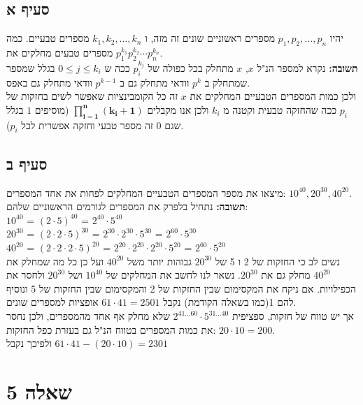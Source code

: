 \documentclass{article}
\begin{document}
	\subsection*{סעיף א}
	יהיו $p_1,p_2,\dots,p_n$ מספרים ראשוניים שונים זה מזה, ו $k_1, k_2,\dots,k_n$ מספרים טבעיים.
	כמה מספרים טבעים מחלקים את $p_1^{k_1}p_2^{k_2}\cdots p_n^{k_n}$. \\
	\textbf{תשובה:}
	נקרא למספר הנ"ל $x$, $x$ מתחלק בכל כפולה של $p_i^{k_j}$ ככה ש $0 \leq j \leq k_i$ בגלל שמספר שמתחלק ב $p^k$ וודאי מתחלק גם ב $p^{k-1}$ וודאי מתחלק גם באפס. \\
	ולכן כמות המספרים הטבעיים המחלקים את $x$ זה כל הקומבינציות שאפשר לשים בחזקות של $p_i$ ככה שהחזקה טבעית וקטנה מ $k_i$
	ולכן אנו מקבלים $\bm{\prod_{i=1}^n (k_i + 1)}$ (מוסיפים $1$ בגלל שגם $0$ זה מספר טבעי וחזקה אפשרית לכל $p_i$).

	\subsection*{סעיף ב}
	מיצאו את מספר המספרים הטבעיים המחלקים לפחות את אחד המספרים: $10^{40}, 20^{30}, 40^{20}$. \\
	\textbf{תשובה:} נתחיל בלפרק את המספרים לגורמים הראשוניים שלהם: \\
	$10^{40}$ = $(2 \cdot 5)^{40}$ = $\boxed{2^{40} \cdot 5^{40}}$ \\
	$20^{30}$ = $(2 \cdot 2 \cdot 5)^{30}$ = $2^{30} \cdot 2^{30} \cdot 5^{30}$ = $\boxed{2^{60} \cdot 5^{30}}$ \\
	$40^{20}$ = $(2 \cdot 2 \cdot 2 \cdot 5)^{20}$ = $2^{20} \cdot 2^{20} \cdot 2^{20} \cdot 5^{20}$ = $\boxed{2^{60} \cdot 5^{20}}$ \\
	נשים לב כי החזקות של 2 ו 5 של $20^{30}$ גבוהות יותר משל $40^{20}$ ועל כן כל מה שמחלק את $40^{20}$ מחלק גם את $20^{30}$.
	נשאר לנו לחשב את המחלקים של $10^{40}$ ושל $20^{30}$ ולחסר את הכפילויות.
	אם ניקח את המקסימום שבין החזקות של 2 והמקסימום שבין החזקות של 5 ונוסיף להם 1(כמו בשאלה הקודמת) נקבל $61 \cdot 41 = 2501$ אופציות למספרים שונים. \\
	אך יש טווח של חזקות, ספציפית $2^{41 \dots 60} \cdot 5^{31 \dots 40}$ שלא מחלק אף אחד מהמספרים, ולכן נחסר את כמות המספרים בטווח הנ"ל גם בעזרת כפל החזקות: $20 \cdot 10 = 200$. \\
	ולפיכך נקבל $61 \cdot 41 - (20 \cdot 10) = 2301$

	\pagebreak
	\section*{שאלה 5}
\end{document}
